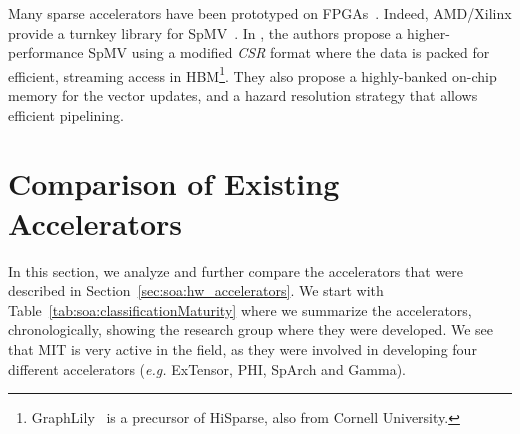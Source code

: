 Many sparse accelerators have been prototyped on FPGAs~\cite{MOHAMMED_2022_SPARSE}. Indeed, AMD/Xilinx provide a turnkey library for SpMV~\cite{Xilinx_Vitis_2021, Li2023_OnXilinx}. In \cite{Du2022_HiSparse}, the authors propose a higher-performance SpMV using a modified \emph{CSR} format where the data is packed for efficient, streaming access in HBM\footnote{GraphLily~\cite{Hu2021_GraphLily} is a precursor of HiSparse, also from Cornell University.}. They also propose a highly-banked on-chip memory for the vector updates, and a hazard resolution strategy that allows efficient pipelining.


\section{Comparison of Existing Accelerators}
\label{sec:soa:comparison_and_analysis}

In this section, we analyze and further compare the accelerators that were described in Section~\ref{sec:soa:hw_accelerators}. We start with Table~\ref{tab:soa:classificationMaturity} where we summarize the accelerators, chronologically, showing the research group where they were developed. We see that MIT is very active in the field, as they were involved in developing four different accelerators (\emph{e.g.} ExTensor, PHI, SpArch and Gamma).

